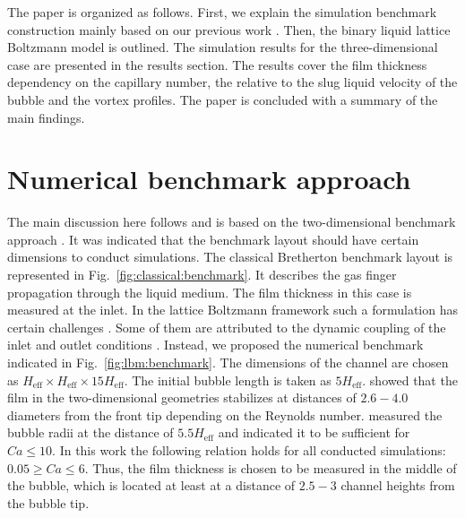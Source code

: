 \documentclass{article}
\begin{document}
The paper is organized as follows.  First, we explain the simulation benchmark construction
mainly based on our previous work \cite{kuzmin-binary2d}. Then, the binary liquid lattice
Boltzmann model is outlined. The simulation results for the three-dimensional case are presented in
the results section. The results cover the film thickness dependency on the capillary number, the
relative to the slug liquid velocity of the bubble and the vortex profiles. The paper
is concluded with a summary of the main findings.

\section{Numerical benchmark approach}
\label{sec:numerical:benchmark}
The main discussion here follows and is based on the two-dimensional benchmark approach
\cite{kuzmin-binary2d}. It was indicated that the benchmark layout should have certain
dimensions to conduct simulations. The classical Bretherton benchmark layout is represented in
Fig.~\ref{fig:classical:benchmark}. It describes the gas finger propagation through the liquid
medium.
The film thickness in this case is measured at the inlet. In the lattice Boltzmann framework such a
formulation has certain challenges \cite{kuzmin-binary2d}. Some of them are attributed to the
dynamic coupling of the inlet and outlet conditions \cite{giavedoni-numerical}. Instead, we
proposed the numerical benchmark indicated in Fig.~\ref{fig:lbm:benchmark}. The dimensions of the
channel are chosen as $H_{\mathrm{eff}}\times H_{\mathrm{eff}} \times 15 H_{\mathrm{eff}}$. The
initial bubble length is taken as $5 H_{\mathrm{eff}}$. \citet{giavedoni-numerical} showed that
the film in the two-dimensional geometries stabilizes at distances of $2.6-4.0$ diameters
from the front tip depending on the Reynolds number. \citet{heil-threedim} measured the bubble radii
at the distance of $5.5 H_{\mathrm{eff}}$ and indicated it to be sufficient for $Ca\leq 10$. In
this work the following relation holds for all conducted simulations: $0.05 \geq Ca \leq 6$.
Thus, the
film thickness is chosen to be measured in the
middle of the bubble, which is located at least at a distance of $2.5-3$ channel heights from the 
bubble tip.%
\end{document}
